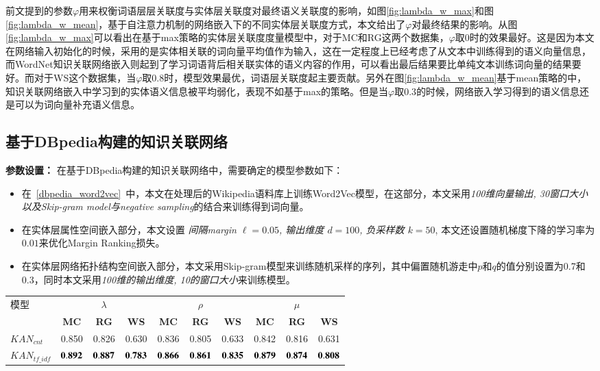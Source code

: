 前文提到的参数$\varphi$用来权衡词语层层关联度与实体层关联度对最终语义关联度的影响，如图\ref{fig:lambda_w_max}和图\ref{fig:lambda_w_mean}，基于自注意力机制的网络嵌入下的不同实体层关联度方式，本文给出了$\varphi$对最终结果的影响。从图\ref{fig:lambda_w_max}可以看出在基于max策略的实体层关联度度量模型中，对于MC和RG这两个数据集，$\varphi$取$0$时的效果最好。这是因为本文在网络输入初始化的时候，采用的是实体相关联的词向量平均值作为输入，这在一定程度上已经考虑了从文本中训练得到的语义向量信息，而WordNet知识关联网络嵌入则起到了学习词语背后相关联实体的语义内容的作用，可以看出最后结果要比单纯文本训练词向量的结果要好。而对于WS这个数据集，当$\varphi$取$0.8$时，模型效果最优，词语层关联度起主要贡献。另外在图\ref{fig:lambda_w_mean}基于mean策略的中，知识关联网络嵌入中学习到的实体语义信息被平均弱化，表现不如基于max的策略。但是当$\varphi$取$0.3$的时候，网络嵌入学习得到的语义信息还是可以为词向量补充语义信息。

\subsection{基于DBpedia构建的知识关联网络}
\textbf{参数设置：}
在基于DBpedia构建的知识关联网络中，需要确定的模型参数如下：
\begin{itemize}
    \item 在~\ref{dbpedia_word2vec}~中，本文在处理后的Wikipedia语料库上训练Word2Vec模型，在这部分，本文采用\emph{100维向量输出, 30窗口大小以及Skip-gram model与negative sampling}的结合来训练得到词向量。
    \item 在实体层属性空间嵌入部分，本文设置 \emph{间隔margin $\ell=0.05$, 输出维度 $d=100$, 负采样数 $k=50$}, 本文还设置随机梯度下降的学习率为$0.01$来优化Margin Ranking损失。
    \item 在实体层网络拓扑结构空间嵌入部分，本文采用Skip-gram模型来训练随机采样的序列，其中偏置随机游走中$p$和$q$的值分别设置为0.7和0.3，同时本文采用\emph{100维的输出维度, 10的窗口大小}来训练模型。
\end{itemize}


\begin{table*}[htbp]
    \center
    \vspace{5pt}
    \begin{tabular}{l|c|c|c|c|c|c|c|c|c}
    \hline
    \multirow{2}{*}{模型} & \multicolumn{3}{c|}{$\lambda$}     & \multicolumn{3}{c|}{$\rho$}          & \multicolumn{3}{c}{$\mu$} \\ \cline{2-10} 
                           & \textbf{MC}&\textbf{RG}&\textbf{WS} & \textbf{MC}&\textbf{RG}&\textbf{WS} & \textbf{MC}&\textbf{RG}&\textbf{WS}\\ \hline
    $KAN_{cnt}$            & 0.850 & 0.826 & 0.630 & 0.836 & 0.805 & 0.633 & 0.842 & 0.816 & 0.631   \\ \hline
    $KAN_{tf\_idf}$        & $\bf 0.892$  & $\bf 0.887$ & $\bf 0.783$ & $\bf 0.866$ & $\bf 0.861$ & $\bf 0.835$ & $\bf 0.879$ & $\bf 0.874$ & $\bf 0.808$ \\ \hline
    \end{tabular}
    \label{table5-6}
\end{table*}


